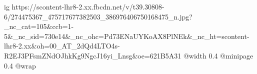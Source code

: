  
 
 
 
 

\ifcmt
  ig https://scontent-lhr8-2.xx.fbcdn.net/v/t39.30808-6/274475367_475717677382503_386976406750168475_n.jpg?_nc_cat=105&ccb=1-5&_nc_sid=730e14&_nc_ohc=Pd73ENaUYKoAX8PlNEk&_nc_ht=scontent-lhr8-2.xx&oh=00_AT_2dQd4LTO4s-R2EJ3PFsmZNdOJhkKg9NgcJ16yi_Lnsg&oe=621B5A31
  @width 0.4
  @minipage 0.4
  @wrap \parpic[r]
\fi
